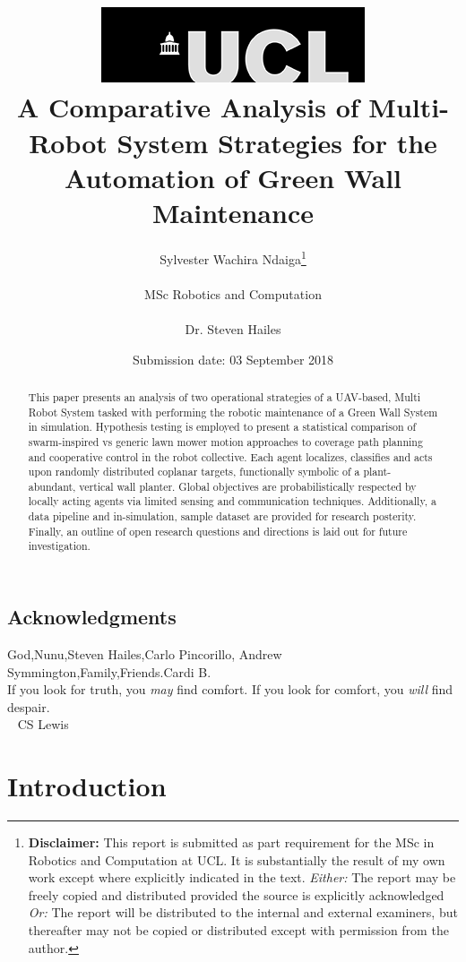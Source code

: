 \documentclass{report}
\title{  	{ \includegraphics[scale=.5]{ucl_logo.png} }\\
{{\Huge A Comparative Analysis of Multi-Robot System Strategies for the Automation of Green Wall Maintenance} }\\
	  }
\date{Submission date: 03 September 2018}
\author{Sylvester Wachira Ndaiga\thanks{
{\bf Disclaimer:}
This report is submitted as part requirement for the MSc in Robotics and Computation at UCL. It is
substantially the result of my own work except where explicitly indicated in the text.
\emph{Either:} The report may be freely copied and distributed provided the source is explicitly acknowledged
\newline  %
\emph{Or:}\newline
The report will be distributed to the internal and external examiners, but thereafter may not be copied or distributed except with permission from the author.}
\\ \\
MSc Robotics and Computation\\ \\
Dr. Steven Hailes}
\begin{document}
 
\onehalfspacing
\maketitle
\begin{abstract}

This paper presents an analysis of two operational strategies of a UAV-based, Multi Robot System tasked with performing the robotic maintenance of a Green Wall System in simulation. Hypothesis testing is employed to present a statistical comparison of swarm-inspired vs generic lawn mower motion approaches to coverage path planning and cooperative control in the robot collective. Each agent localizes, classifies and acts upon randomly distributed coplanar targets, functionally symbolic of a plant-abundant, vertical wall planter. Global objectives are probabilistically respected by locally acting agents via limited sensing and communication techniques. Additionally, a data pipeline and in-simulation, sample dataset are provided for research posterity. Finally, an outline of open research questions and directions is laid out for future investigation.

\end{abstract}
\tableofcontents
\setcounter{page}{1}

\newpage
\section*{Acknowledgments}
God,Nunu,Steven Hailes,Carlo Pincorillo, Andrew Symmington,Family,Friends.Cardi B.
\vspace{5cm}
\\
If you look for truth, you \textit{may} find comfort.
If you look for comfort, you \textit{will} find despair.
\\
~ CS Lewis

\chapter{Introduction}
\end{document}
